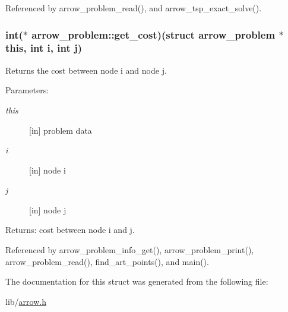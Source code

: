 Referenced by arrow\_\-problem\_\-read(), and arrow\_\-tsp\_\-exact\_\-solve().\hypertarget{structarrow__problem_4f1f4c9ef90f240b248e8f39360da769}{
\subsubsection{\setlength{\rightskip}{0pt plus 5cm}int($\ast$ {\bf arrow\_\-problem::get\_\-cost})(struct {\bf arrow\_\-problem} $\ast$this, int i, int j)}}
\label{structarrow__problem_4f1f4c9ef90f240b248e8f39360da769}


Returns the cost between node i and node j. 

\begin{Desc}
\item[Parameters:]
\begin{description}
\item[{\em this}]\mbox{[}in\mbox{]} problem data \item[{\em i}]\mbox{[}in\mbox{]} node i \item[{\em j}]\mbox{[}in\mbox{]} node j \end{description}
\end{Desc}
\begin{Desc}
\item[Returns:]cost between node i and j. \end{Desc}


Referenced by arrow\_\-problem\_\-info\_\-get(), arrow\_\-problem\_\-print(), arrow\_\-problem\_\-read(), find\_\-art\_\-points(), and main().

The documentation for this struct was generated from the following file:\begin{CompactItemize}
\item 
lib/\hyperlink{arrow_8h}{arrow.h}\end{CompactItemize}

